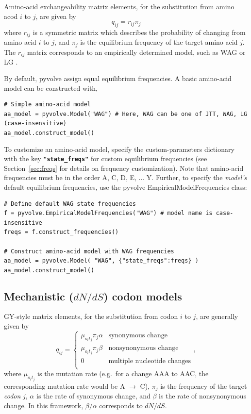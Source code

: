 \documentclass{article}
\newcommand{\code}[1]{\textbf{\texttt{\small{#1}}}}
\begin{document}
Amino-acid exchangeability matrix elements, for the substitution from amino acod $i$ to $j$, are given by 
\begin{equation}
q_{ij} = r_{ij} \pi_j
\end{equation}
where $r_{ij}$ is a symmetric matrix which describes the probability of changing from amino acid $i$ to $j$, and $\pi_j$ is the equilibrium frequency of the target amino acid $j$. The $r_{ij}$ matrix corresponds to an empirically determined model, such as WAG \citep{WAG} or LG \citep{LG}. 

By default, pyvolve assign equal equilibrium frequencies. A basic amino-acid model can be constructed with, 
\begin{lstlisting}
# Simple amino-acid model 
aa_model = pyvolve.Model("WAG") # Here, WAG can be one of JTT, WAG, LG (case-insensitive)
aa_model.construct_model()
\end{lstlisting}

To customize an amino-acid model, specify the custom-parameters dictionary with the key \code{"state\_freqs"} for custom equilibrium frequencies (see Section~\ref{sec:freqs} for details on frequency customization). Note that amino-acid frequencies must be in the order A, C, D, E, ... Y. Further, to specify the \textit{model's} default equilibrium frequencies, use the pyvolve EmpiricalModelFrequencies class:
\begin{lstlisting}
# Define default WAG state frequencies
f = pyvolve.EmpiricalModelFrequencies("WAG") # model name is case-insensitive
freqs = f.construct_frequencies()

# Construct amino-acid model with WAG frequencies
aa_model = pyvolve.Model( "WAG", {"state_freqs":freqs} )
aa_model.construct_model()
\end{lstlisting}



\subsection{Mechanistic ($dN/dS$) codon models}\label{sec:mechcodon_basic}

GY-style \citep{GY94} matrix elements, for the substitution from codon $i$ to $j$, are generally given by 
\begin{equation}\label{eq:GY94}
q_{ij} = \left\{ 
\begin{array}{rl}
\mu_{o_it_j} \pi_j \alpha      & \text{synonymous change} \\
\mu_{o_it_j} \pi_j \beta       & \text{nonsynonymous change} \\
0                    & \text{multiple nucleotide changes} \\             
\end{array} \right.,
\end{equation}
where $\mu_{o_it_j}$ is the mutation rate (e.g.\ for a change AAA to AAC, the corresponding mutation rate would be A $\rightarrow$ C), $\pi_j$ is the frequency of the target \emph{codon} $j$, $\alpha$ is the rate of synonymous change, and $\beta$ is the rate of nonsynonymous change. In this framework, $\beta / \alpha$ corresponds to $dN/dS$.
\end{document}
